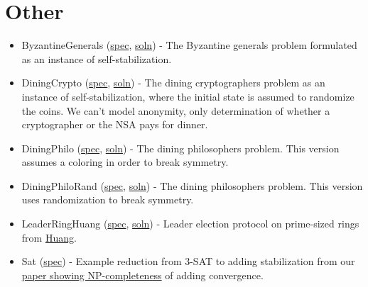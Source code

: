\section{Other}

\begin{itemize}
\item ByzantineGenerals (\href{\examplespec/ByzantineGenerals.prot}{spec}, \href{\examplesoln/ByzantineGenerals.prot}{soln})
- The Byzantine generals problem formulated as an instance of self-stabilization.
\item DiningCrypto (\href{\examplespec/DiningCrypto.prot}{spec}, \href{\examplesoln/DiningCrypto.prot}{soln})
- The dining cryptographers problem as an instance of self-stabilization, where the initial state is assumed to randomize the coins.
We can't model anonymity, only determination of whether a cryptographer or the NSA pays for dinner.
\item DiningPhilo (\href{\examplespec/DiningPhilo.prot}{spec}, \href{\examplesoln/DiningPhilo.prot}{soln})
- The dining philosophers problem. This version assumes a coloring in order to break symmetry.
\item DiningPhiloRand (\href{\examplespec/DiningPhiloRand.prot}{spec}, \href{\examplesoln/DiningPhiloRand.prot}{soln})
- The dining philosophers problem. This version uses randomization to break symmetry.
\item LeaderRingHuang (\href{\examplespec/LeaderRingHuang.prot}{spec}, \href{\examplesoln/LeaderRingHuang.prot}{soln})
- Leader election protocol on prime-sized rings from \href{http://dx.doi.org/10.1145/169683.174161}{Huang}.
\item Sat (\href{\examplespec/Sat.prot}{spec})
- Example reduction from 3-SAT to adding stabilization from our \href{http://dx.doi.org/10.1007/978-3-642-40213-5_2}{paper showing NP-completeness} of adding convergence.
\end{itemize}




